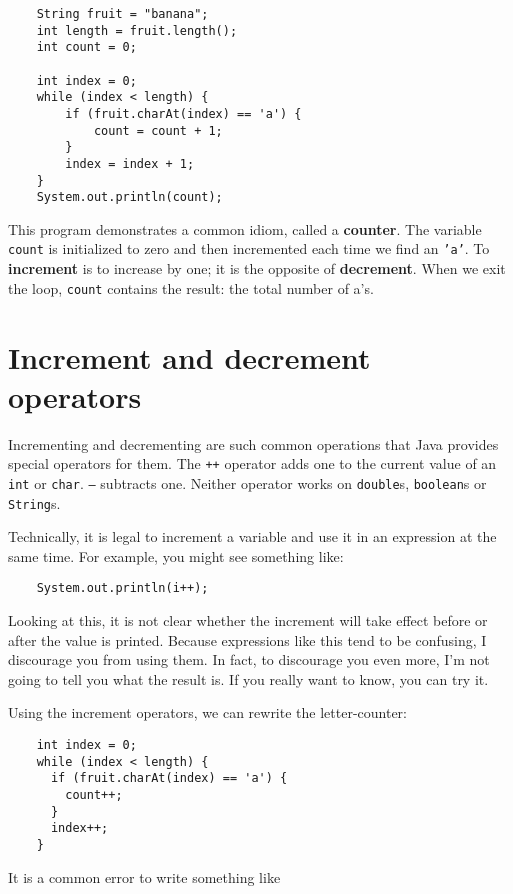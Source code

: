 \begin{lstlisting}
    String fruit = "banana";
    int length = fruit.length();
    int count = 0;

    int index = 0;
    while (index < length) {
        if (fruit.charAt(index) == 'a') {
            count = count + 1;
        }
        index = index + 1;
    }
    System.out.println(count);
\end{lstlisting}
%
This program demonstrates a common idiom, called a {\bf counter}.  The
variable {\tt count} is initialized to zero and then incremented each
time we find an {\tt 'a'}. To {\bf increment} is to increase by one;
it is the opposite of {\bf decrement}.
When we exit the loop, {\tt count}
contains the result: the total number of a's.


\section{Increment and decrement operators}

Incrementing and decrementing are such common operations that
Java provides special operators for them.  The {\tt ++}
operator adds one to the current value of an {\tt int} or
{\tt char}.  {\tt --} subtracts one.  Neither operator works
on {\tt double}s, {\tt boolean}s or {\tt String}s.

Technically, it is legal to increment a variable and use it
in an expression at the same time.  For example, you might see
something like:

\begin{lstlisting}
    System.out.println(i++);
\end{lstlisting}
%
Looking at this, it is not clear whether the increment will
take effect before or after the value is printed.  Because
expressions like this tend to be confusing, I discourage
you from using them.  In fact, to discourage you even more,
I'm not going to tell you what the result is.  If you really
want to know, you can try it.

Using the increment operators, we can rewrite the letter-counter:

\begin{lstlisting}
    int index = 0;
    while (index < length) {
      if (fruit.charAt(index) == 'a') {
        count++;
      }
      index++;
    }
\end{lstlisting}
%
It is a common error to write something like

